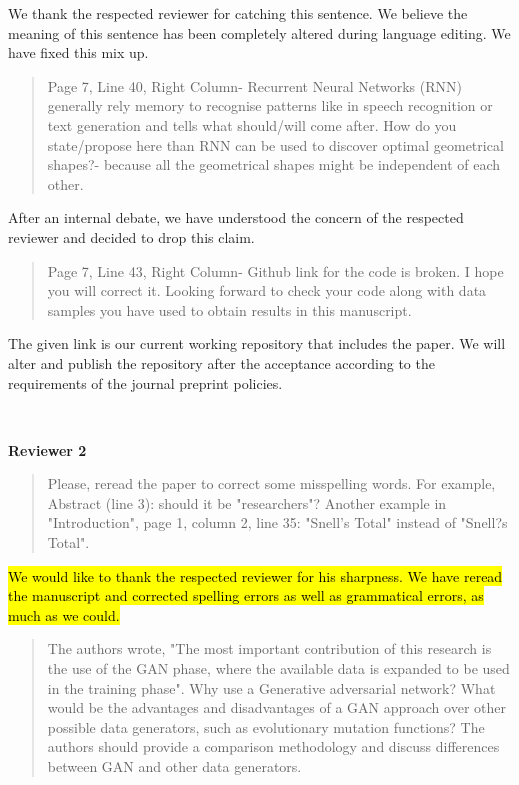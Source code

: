 \documentclass{article}
\begin{document}
	We thank the respected reviewer for catching this sentence. We believe the meaning of this sentence has been completely altered during language editing. We have fixed this mix up. 
	
	\begin{quote}
	Page 7, Line 40, Right Column- Recurrent Neural Networks (RNN) generally rely memory to recognise patterns like in speech recognition or text generation and tells what should/will come after. How do you state/propose here than RNN can be used to discover optimal geometrical shapes?- because all the geometrical shapes might be independent of each other.
	\end{quote}
	
	After an internal debate, we have understood the concern of the respected reviewer and decided to drop this claim.
	
	\begin{quote}
	Page 7, Line 43, Right Column- Github link for the code is broken. I hope you will correct it. Looking forward to check your code along with data samples you have used  to obtain results in this manuscript.
	\end{quote}
	
	The given link is our current working repository that includes the paper. We will alter and publish the repository after the acceptance according to the requirements of the journal preprint policies.
	
	~
	
	{\bfseries\large Reviewer 2}
	
	\begin{quote}
	 Please, reread the paper to correct some misspelling words. For example, Abstract (line 3): should it be "researchers"? Another example in "Introduction", page 1, column 2, line 35: "Snell's Total" instead of "Snell?s Total".
	\end{quote}
	
	\hl{We would like to thank the respected reviewer for his sharpness. We have reread the manuscript and corrected spelling errors as well as grammatical errors, as much as we could. }
	
	\begin{quote}
	The authors wrote, "The most important contribution of this research is the use of
the GAN phase, where the available data is expanded to be
used in the training phase". Why use a Generative adversarial network? What would be the advantages and disadvantages of a GAN approach over other possible data generators, such as evolutionary mutation functions? The authors should provide a comparison methodology and discuss differences between GAN and other data generators.
	\end{quote}
	
\end{document}
